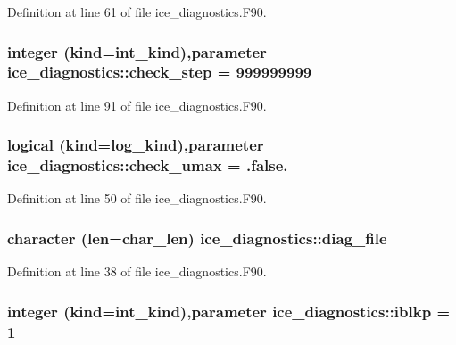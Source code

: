 Definition at line 61 of file ice\_\-diagnostics.F90.\hypertarget{namespaceice__diagnostics_a56f414ee41003dd64ac88912858325bb}{
\subsubsection[{check\_\-step}]{\setlength{\rightskip}{0pt plus 5cm}integer (kind=int\_\-kind),parameter {\bf ice\_\-diagnostics::check\_\-step} = 999999999}}
\label{namespaceice__diagnostics_a56f414ee41003dd64ac88912858325bb}


Definition at line 91 of file ice\_\-diagnostics.F90.\hypertarget{namespaceice__diagnostics_a2a08d0704bb691e6ffeaec5bd6d8cbc4}{
\subsubsection[{check\_\-umax}]{\setlength{\rightskip}{0pt plus 5cm}logical (kind=log\_\-kind),parameter {\bf ice\_\-diagnostics::check\_\-umax} = .false.}}
\label{namespaceice__diagnostics_a2a08d0704bb691e6ffeaec5bd6d8cbc4}


Definition at line 50 of file ice\_\-diagnostics.F90.\hypertarget{namespaceice__diagnostics_a0a7c9100fd06a3512e3f27d229758d8c}{
\subsubsection[{diag\_\-file}]{\setlength{\rightskip}{0pt plus 5cm}character (len=char\_\-len) {\bf ice\_\-diagnostics::diag\_\-file}}}
\label{namespaceice__diagnostics_a0a7c9100fd06a3512e3f27d229758d8c}


Definition at line 38 of file ice\_\-diagnostics.F90.\hypertarget{namespaceice__diagnostics_ac94aaaf81208df171bff46a024ccdcb1}{
\subsubsection[{iblkp}]{\setlength{\rightskip}{0pt plus 5cm}integer (kind=int\_\-kind),parameter {\bf ice\_\-diagnostics::iblkp} = 1}}
\label{namespaceice__diagnostics_ac94aaaf81208df171bff46a024ccdcb1}


